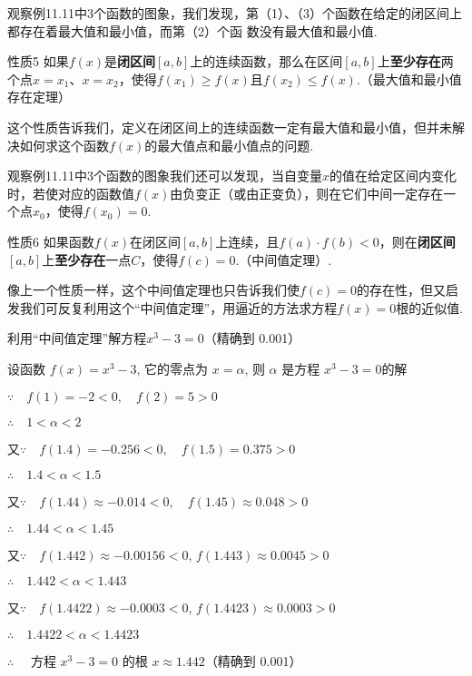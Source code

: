 观察例11.11中3个函数的图象，我们发现，第（1）、（3）个函数在给定的闭区间上都存在着最大值和最小值，而第（2）个函
数没有最大值和最小值.

\begin{thm}{性质5}
    如果$f(x)$是\textbf{闭区间}$[a,b]$上的连续函数，那么在区间$[a,b]$上\textbf{至少存在}两个点$x=x_1$、$x=x_2$，使得$f(x_1)\ge f(x)$且$f(x_2)\le f(x)$.（最大值和最小值存在定理）
\end{thm}

这个性质告诉我们，定义在闭区间上的连续函数一定有最大值和最小值，但并未解决如何求这个函数$f(x)$的最大值点和最小值点的问题.

观察例11.11中3个函数的图象我们还可以发现，当自变量$x$的值在给定区间内变化时，若使对应的函数值$f(x)$由负变正（或由正变负），则在它们中间一定存在一个点$x_0$，使得$f(x_0)=0$.

\begin{thm}{性质6}
    如果函数$f(x)$在闭区间$[a,b]$上连续，且$f(a)\cdot f(b)<0$，则在\textbf{闭区间}$[a,b]$上\textbf{至少存在}一点$C$，使得$f(c)=0$.（中间值定理）.
\end{thm}

像上一个性质一样，这个中间值定理也只告诉我们使$f(c)=0$的存在性，但又启发我们可反复利用这个“中间值定理”，用逼近的方法求方程$f(x)=0$根的近似值.







\begin{example}
    利用“中间值定理”解方程$x^3-3=0$（精确到
0.001）
\end{example}

\begin{solution}
设函数 $f(x)=x^3-3$, 它的零点为 $x=\alpha$, 则 $\alpha$ 是方程
$x^3-3=0$的解

$\because\quad f( 1) = - 2< 0,\quad  f( 2) = 5> 0$

$\therefore\quad 1< \alpha < 2$ 

又$\because\quad f( 1. 4) = - 0.256< 0,\quad  f(1.5) = 0.375> 0$ 

$\therefore\quad 1.4< \alpha < 1.5$ 

又$\because\quad f( 1. 44) \approx - 0. 014< 0,\quad  f( 1. 45) \approx 0. 048> 0$

$\therefore\quad 1.44<\alpha<1.45$

又$\because\quad f( 1. 442) \approx - 0. 00156< 0$, 
$f(1.443)\approx0.0045>0$

$\therefore\quad 1. 442< \alpha < 1. 443$

又$\because\quad f( 1. 4422) \approx - 0. 0003< 0$, 
$f(1.4423)\approx0.0003>0$

$\therefore\quad 1. 4422< \alpha < 1. 4423$

$\therefore\quad $ 方程 $x^3-3=0$ 的根 $x\approx1.442$（精确到 0.001）
\end{solution}

